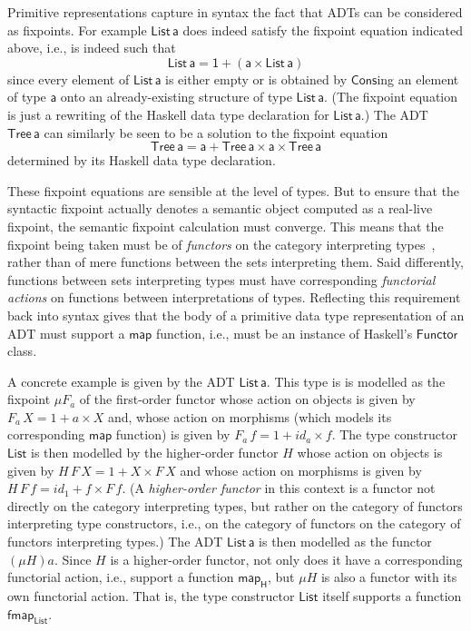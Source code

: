 \documentclass[acmsmall,screen,review,anonymous]{acmart}
\theoremstyle{definition}
\renewcommand{\id}{\mathit{id}}
\begin{document}
Primitive representations capture in syntax the fact that ADTs can be
considered as fixpoints. For example $\mathsf{List\,a}$ does indeed
satisfy the fixpoint equation indicated above, i.e., is indeed such
that
\[\mathsf{List\,a} = \mathsf{1 + (a \times List\,a)}\] 
since every element of $\mathsf{List\,a}$ is either empty or is
obtained by $\mathsf{Cons}$ing an element of type $\mathsf{a}$ onto an
already-existing structure of type $\mathsf{List\,a}$. (The fixpoint
equation is just a rewriting of the Haskell data type declaration for
$\mathsf{List\,a}$.) The ADT $\mathsf{Tree\,a}$ can similarly be seen
to be a solution to the fixpoint equation
\[\mathsf{Tree\,a} = \mathsf{a + Tree\,a \times a \times Tree\,a}\] 
determined by its Haskell data type declaration.

These fixpoint equations are sensible at the level of types. But to
ensure that the syntactic fixpoint actually denotes a semantic object
computed as a real-live fixpoint, the semantic fixpoint calculation
must converge. This means that the fixpoint being taken must be of
{\em functors} on the category interpreting types~\cite{tfca}, rather
than of mere functions between the sets interpreting them. Said
differently, functions between sets interpreting types must have
corresponding {\em functorial actions} on functions between
interpretations of types. Reflecting this requirement back into syntax
gives that the body of a primitive data type representation of an ADT
must support a $\mathsf{map}$ function, i.e., must be an instance of
Haskell's $\mathsf{Functor}$ class.

A concrete example is given by the ADT $\mathsf{List\,a}$. This type
is is modelled as the fixpoint $\mu F_a$ of the first-order functor
whose action on objects is given by $F_a\,X = 1 + a \times X$ and,
whose action on morphisms (which models its corresponding
$\mathsf{map}$ function) is given by $F_a\,f = 1 + \id_a \times
f$. The type constructor $\mathsf{List}$ is then modelled by the
higher-order functor $H$ whose action on objects is given by $H\,F\,X
= 1 + X \times F\,X$ and whose action on morphisms is given by
$H\,F\,f = \id_1 + f \times F\,f$. (A {\em higher-order functor} in
this context is a functor not directly on the category interpreting
types, but rather on the category of functors interpreting type
constructors, i.e., on the category of functors on the category of
functors interpreting types.) The ADT $\mathsf{List\,a}$ is then
modelled as the functor $(\mu H)a$. Since $H$ is a higher-order
functor, not only does it have a corresponding functorial action,
i.e., support a function $\mathsf{map_H}$, but $\mu H$ is also a
functor with its own functorial action. That is, the type constructor
$\mathsf{List}$ itself supports a function $\mathsf{fmap_{List}}$.
\end{document}

